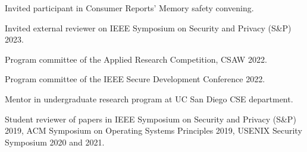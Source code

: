 { Invited participant in Consumer Reports' Memory safety convening. }

{ Invited external reviewer on IEEE Symposium on Security and Privacy (S\&P) 2023.}

{ Program committee of the Applied Research Competition, CSAW 2022. }

{ Program committee of the IEEE Secure Development Conference 2022. }

{ Mentor in  undergraduate research program at UC San Diego CSE department. }

{ Student reviewer of papers in IEEE Symposium on Security and Privacy (S\&P)
2019, ACM Symposium on Operating Systems Principles 2019, USENIX Security
Symposium 2020 and 2021. }
